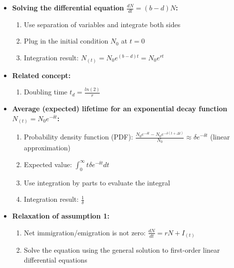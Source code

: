 \documentclass[
]{book}
\providecommand{\tightlist}{%
  \setlength{\itemsep}{0pt}\setlength{\parskip}{0pt}}
\begin{document}
\begin{itemize}
\tightlist
\item
  \textbf{Solving the differential equation \(\frac{dN}{dt} = (b-d)N\):}

  \begin{enumerate}
  \def\labelenumi{\arabic{enumi}.}
  \tightlist
  \item
    Use separation of variables and integrate both sides
  \item
    Plug in the initial condition \(N_0\) at \(t = 0\)
  \item
    Integration result: \(N_{(t)} = N_0e^{(b-d)t} = N_0e^{rt}\)
  \end{enumerate}
\end{itemize}

\begin{itemize}
\tightlist
\item
  \textbf{Related concept:}

  \begin{enumerate}
  \def\labelenumi{\arabic{enumi}.}
  \tightlist
  \item
    Doubling time \(t_d = \frac{ln(2)}{r}\)
  \end{enumerate}
\end{itemize}

\begin{itemize}
\tightlist
\item
  \textbf{Average (expected) lifetime for an exponential decay function \(N_{(t)} = N_0e^{-\delta t}\):}

  \begin{enumerate}
  \def\labelenumi{\arabic{enumi}.}
  \tightlist
  \item
    Probability density function (PDF): \(\frac{N_0e^{-\delta t} - N_0e^{-\delta (t+\Delta t)}}{N_0} \approx \delta e^{-\delta t}\) (linear approximation)
  \item
    Expected value: \(\int_{0}^{\infty}t\delta e^{-\delta t}dt\)
  \item
    Use integration by parts to evaluate the integral
  \item
    Integration result: \(\frac{1}{\delta}\)
  \end{enumerate}
\end{itemize}

\begin{itemize}
\tightlist
\item
  \textbf{Relaxation of assumption 1:}

  \begin{enumerate}
  \def\labelenumi{\arabic{enumi}.}
  \tightlist
  \item
    Net immigration/emigration is not zero: \(\frac{dN}{dt} = rN + I_{(t)}\)
  \item
    Solve the equation using the general solution to first-order linear differential equations
  \end{enumerate}
\end{itemize}
\end{document}
